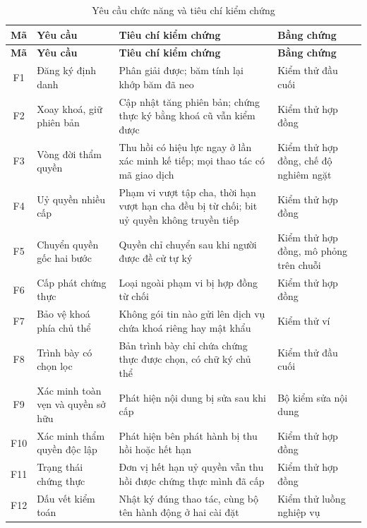 \begin{longtable}{|c|p{3.4cm}|p{6.0cm}|p{3.0cm}|}
\caption{Yêu cầu chức năng và tiêu chí kiểm chứng}
\label{tab:v2-func} \\
\hline
\textbf{Mã} & \textbf{Yêu cầu} & \textbf{Tiêu chí kiểm chứng} & \textbf{Bằng chứng} \\ \hline
\endfirsthead
\hline
\textbf{Mã} & \textbf{Yêu cầu} & \textbf{Tiêu chí kiểm chứng} & \textbf{Bằng chứng} \\ \hline
\endhead
F1 & Đăng ký định danh & Phân giải được; băm tính lại khớp băm đã neo & Kiểm thử đầu cuối \\ \hline
F2 & Xoay khoá, giữ phiên bản & Cập nhật tăng phiên bản; chứng thực ký bằng khoá cũ vẫn kiểm được & Kiểm thử hợp đồng \\ \hline
F3 & Vòng đời thẩm quyền & Thu hồi có hiệu lực ngay ở lần xác minh kế tiếp; mọi thao tác có mã giao dịch & Kiểm thử hợp đồng, chế độ nghiêm ngặt \\ \hline
F4 & Uỷ quyền nhiều cấp & Phạm vi vượt tập cha, thời hạn vượt hạn cha đều bị từ chối; bit uỷ quyền không truyền tiếp & Kiểm thử hợp đồng \\ \hline
F5 & Chuyển quyền gốc hai bước & Quyền chỉ chuyển sau khi người được đề cử tự ký & Kiểm thử hợp đồng, mô phỏng trên chuỗi \\ \hline
F6 & Cấp phát chứng thực & Loại ngoài phạm vi bị hợp đồng từ chối & Kiểm thử hợp đồng \\ \hline
F7 & Bảo vệ khoá phía chủ thể & Không gói tin nào gửi lên dịch vụ chứa khoá riêng hay mật khẩu & Kiểm thử ví \\ \hline
F8 & Trình bày có chọn lọc & Bản trình bày chỉ chứa chứng thực được chọn, có chữ ký chủ thể & Kiểm thử đầu cuối \\ \hline
F9 & Xác minh toàn vẹn và quyền sở hữu & Phát hiện nội dung bị sửa sau khi cấp & Bộ kiểm sửa nội dung \\ \hline
F10 & Xác minh thẩm quyền độc lập & Phát hiện bên phát hành bị thu hồi hoặc hết hạn & Kiểm thử hợp đồng \\ \hline
F11 & Trạng thái chứng thực & Đơn vị hết hạn uỷ quyền vẫn thu hồi được chứng thực mình đã cấp & Kiểm thử hợp đồng \\ \hline
F12 & Dấu vết kiểm toán & Nhật ký đúng thao tác, cùng bộ tên hành động ở hai cài đặt & Kiểm thử luồng nghiệp vụ \\ \hline
\end{longtable}
